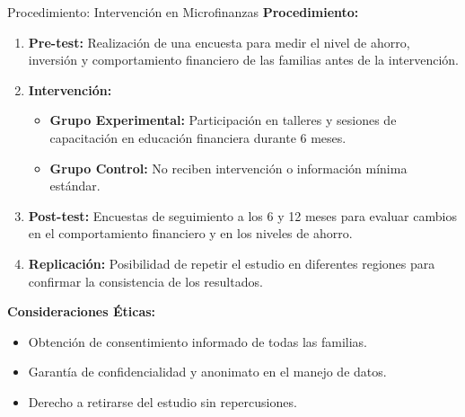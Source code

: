 ﻿\documentclass{beamer}
\begin{document}
\begin{frame}{Procedimiento: Intervención en Microfinanzas}
  \textbf{Procedimiento:}
  \begin{enumerate}
      \item \textbf{Pre-test:} Realización de una encuesta para medir el nivel de ahorro, inversión y comportamiento financiero de las familias antes de la intervención.
      \item \textbf{Intervención:}
      \begin{itemize}
          \item \textbf{Grupo Experimental:} Participación en talleres y sesiones de capacitación en educación financiera durante 6 meses.
          \item \textbf{Grupo Control:} No reciben intervención o información mínima estándar.
      \end{itemize}
      \item \textbf{Post-test:} Encuestas de seguimiento a los 6 y 12 meses para evaluar cambios en el comportamiento financiero y en los niveles de ahorro.
      \item \textbf{Replicación:} Posibilidad de repetir el estudio en diferentes regiones para confirmar la consistencia de los resultados.
  \end{enumerate}
  
  \vspace{2mm}
  \textbf{Consideraciones Éticas:}
  \begin{itemize}
      \item Obtención de consentimiento informado de todas las familias.
      \item Garantía de confidencialidad y anonimato en el manejo de datos.
      \item Derecho a retirarse del estudio sin repercusiones.
  \end{itemize}
  
\end{frame}
\end{document}
